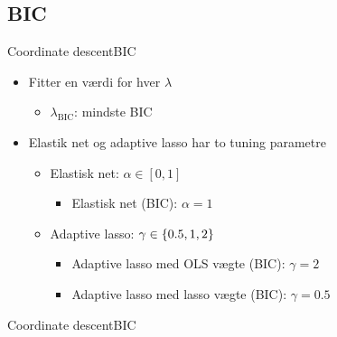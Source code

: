 \subsection{BIC}
\begin{frame}{Coordinate descent}{BIC}
\begin{itemize}
\item Fitter en værdi for hver $\lambda$
\begin{itemize}
\item $\lambda_{\text{BIC}}$: mindste BIC
\end{itemize}
\item Elastik net og adaptive lasso har to tuning parametre 
\begin{itemize}
\item Elastisk net: $\alpha \in [0,1]$ 
\begin{itemize}
\item Elastisk net (BIC): $\alpha = 1$
\end{itemize}
\item Adaptive lasso: $\gamma \in \cbr{0.5, 1, 2}$
\begin{itemize}
\item Adaptive lasso med OLS vægte (BIC): $\gamma = 2$
\item Adaptive lasso med lasso vægte (BIC): $\gamma = 0.5$
\end{itemize}
\end{itemize}
\end{itemize}
\end{frame}


\begin{frame}{Coordinate descent}{BIC}

\end{frame}


